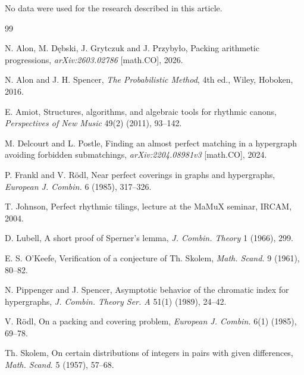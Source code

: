 \documentclass[twoside,12pt]{article}
\numberwithin{equation}{section}
\begin{document}
\medskip
{} No data were used for the research described in this article.

\begin{thebibliography}{99}

N. Alon, M. D\k{e}bski, J. Grytczuk and J. Przyby\l{}o,
Packing arithmetic progressions,
\emph{arXiv:2603.02786} [math.CO], 2026.

N. Alon and J. H. Spencer,
\emph{The Probabilistic Method},
4th ed., Wiley, Hoboken, 2016.

E. Amiot,
Structures, algorithms, and algebraic tools for rhythmic canons,
\emph{Perspectives of New Music} 49(2) (2011), 93--142.

M. Delcourt and L. Postle,
Finding an almost perfect matching in a hypergraph avoiding forbidden submatchings,
\emph{arXiv:2204.08981v3} [math.CO], 2024.

P. Frankl and V. R\"odl,
Near perfect coverings in graphs and hypergraphs,
\emph{European J. Combin.} 6 (1985), 317--326.

T. Johnson,
Perfect rhythmic tilings,
lecture at the MaMuX seminar, IRCAM, 2004.

D. Lubell,
A short proof of Sperner's lemma,
\emph{J. Combin. Theory} 1 (1966), 299.

E. S. O'Keefe,
Verification of a conjecture of Th. Skolem,
\emph{Math. Scand.} 9 (1961), 80--82.

N. Pippenger and J. Spencer,
Asymptotic behavior of the chromatic index for hypergraphs,
\emph{J. Combin. Theory Ser. A} 51(1) (1989), 24--42.

V. R\"odl,
On a packing and covering problem,
\emph{European J. Combin.} 6(1) (1985), 69--78.

Th. Skolem,
On certain distributions of integers in pairs with given differences,
\emph{Math. Scand.} 5 (1957), 57--68.

\end{thebibliography}
\end{document}
